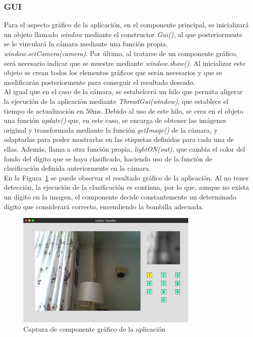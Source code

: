 \subsubsection{GUI}
Para el aspecto gráfico de la aplicación, en el componente principal, se inicializará un objeto llamado \textit{window} mediante el constructor \textit{Gui()}, al que posteriormente se le vinculará la cámara mediante una función propia, \textit{window.setCamera(camera)}. Por último, al tratarse de un componente gráfico, será necesario indicar que se muestre mediante \textit{window.show()}. Al inicializar este objeto se crean todos los elementos gráficos que serán necesarios y que se modificarán posteriormente para conseguir el resultado deseado.\\

Al igual que en el caso de la cámara, se estabelcerá un hilo que permita aligerar la ejecución de la aplicación mediante \textit{ThreadGui(window)}, que establece el tiempo de actualización en 50ms. Debido al uso de este hilo, se crea en el objeto una función \textit{update()} que, en este caso, se encarga de obtener las imágenes original y transformada mediante la función \textit{getImage()} de la cámara, y adaptarlas para poder mostrarlas en las etiquetas definidas para cada una de ellas. Además, llama a otra función propia, \textit{lightON(out)}, que cambia el color del fondo del dígito que se haya clasificado, haciendo uso de la función de clasificación definida anteriormente en la cámara.\\

En la Figura~\ref{fig.gui} se puede observar el resultado gráfico de la aplicación. Al no tener detección, la ejecución de la clasificación es continua, por lo que, aunque no exista un dígito en la imagen, el componente decide constantemente un determinado dígito que considerará correcto, encendiendo la bombilla adecuada.\\

\begin{figure}[H]
	\begin{center}
		\includegraphics[width=0.8\textwidth]{figures/gui}
		\caption{Captura de componente gráfico de la aplicación}
		\label{fig.gui}
	\end{center}
\end{figure}

